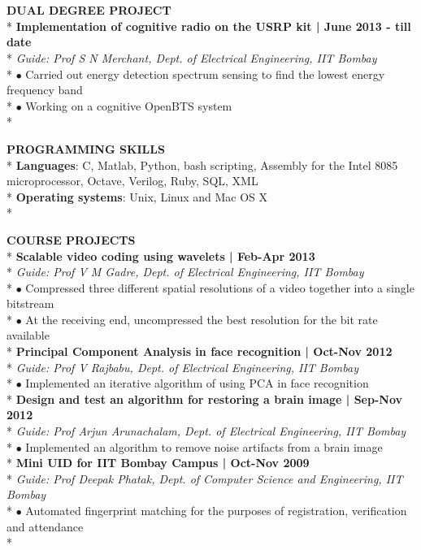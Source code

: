 \documentclass[11pt]{article}
\begin{document}
\section*{}


\vspace*{6\baselineskip}
\noindent \uppercase{\textbf{Dual Degree Project}} \\*
\textbf{Implementation of cognitive radio on the USRP kit | June 2013 - till date} \\*
\emph{Guide: Prof S N Merchant, Dept. of Electrical Engineering, IIT Bombay}  \\* 
$\bullet$ Carried out energy detection spectrum sensing to find the lowest energy frequency band  \\*
$\bullet$ Working on a cognitive OpenBTS system \\*

\noindent \uppercase{\textbf{Programming skills}} \\*
\textbf{Languages}: C, Matlab, Python, bash scripting, Assembly for the Intel 8085 microprocessor, Octave, Verilog, Ruby, SQL, XML \\*
\textbf{Operating systems}: Unix, Linux and Mac OS X \\*


\noindent \uppercase{\textbf{Course projects}} \\*
\textbf{Scalable video coding using wavelets | Feb-Apr 2013}\\*
\emph{Guide: Prof V M Gadre, Dept. of Electrical Engineering, IIT Bombay} \\*
$\bullet$ Compressed three different spatial resolutions of a video together into a single bitstream \\*
$\bullet$ At the receiving end, uncompressed the best resolution for the bit rate available \\*
\textbf{Principal Component Analysis in face recognition | Oct-Nov 2012} \\*
\emph{Guide: Prof V Rajbabu, Dept. of Electrical Engineering, IIT Bombay} \\*
$\bullet$ Implemented an iterative algorithm of using PCA in face recognition \\*
\textbf{Design and test an algorithm for restoring a brain image | Sep-Nov 2012} \\*
\emph{Guide: Prof Arjun Arunachalam, Dept. of Electrical Engineering, IIT Bombay} \\*
$\bullet$ Implemented an algorithm to remove noise artifacts from a brain image \\*
\textbf{Mini UID for IIT Bombay Campus | Oct-Nov 2009} \\*
\emph{Guide: Prof Deepak Phatak, Dept. of Computer Science and Engineering, IIT Bombay}\\*
$\bullet$ Automated fingerprint matching for the purposes of registration, verification and attendance \\*
\end{document}
